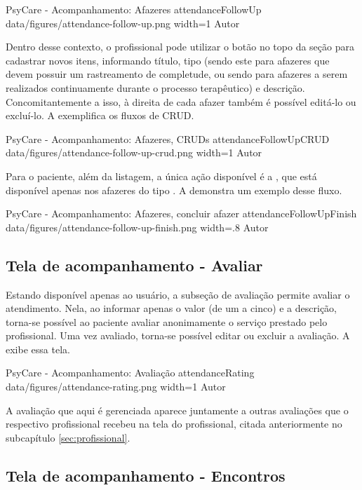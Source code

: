 \image
    {PsyCare - Acompanhamento: Afazeres}
    {attendanceFollowUp}
    {data/figures/attendance-follow-up.png}
    {width=1\textwidth}
    {Autor}

Dentro desse contexto, o profissional pode utilizar o botão  no topo da seção para cadastrar novos itens, informando título, tipo (sendo este  para afazeres que devem possuir um rastreamento de completude, ou sendo  para afazeres a serem realizados continuamente durante o processo terapêutico) e descrição. Concomitantemente a isso, à direita de cada afazer também é possível editá-lo ou excluí-lo. A  exemplifica os fluxos de CRUD.

\image
    {PsyCare - Acompanhamento: Afazeres, CRUDs}
    {attendanceFollowUpCRUD}
    {data/figures/attendance-follow-up-crud.png}
    {width=1\textwidth}
    {Autor}

Para o paciente, além da listagem, a única ação disponível é a , que está disponível apenas nos afazeres do tipo . A  demonstra um exemplo desse fluxo.

\image
    {PsyCare - Acompanhamento: Afazeres, concluir afazer}
    {attendanceFollowUpFinish}
    {data/figures/attendance-follow-up-finish.png}
    {width=.8\textwidth}
    {Autor}

\subsection{Tela de acompanhamento - Avaliar}
\label{sec:acompanhamentoAvaliar}

Estando disponível apenas ao usuário, a subseção de avaliação permite avaliar o atendimento. Nela, ao informar apenas o valor (de um a cinco) e a descrição, torna-se possível ao paciente avaliar anonimamente o serviço prestado pelo profissional. Uma vez avaliado, torna-se possível editar ou excluir a avaliação. A  exibe essa tela.

\image
    {PsyCare - Acompanhamento: Avaliação}
    {attendanceRating}
    {data/figures/attendance-rating.png}
    {width=1\textwidth}
    {Autor}

A avaliação que aqui é gerenciada aparece juntamente a outras avaliações que o respectivo profissional recebeu na tela do profissional, citada anteriormente no subcapítulo \ref{sec:profissional}.

\subsection{Tela de acompanhamento - Encontros}
\label{sec:acompanhamentoEncontros}


